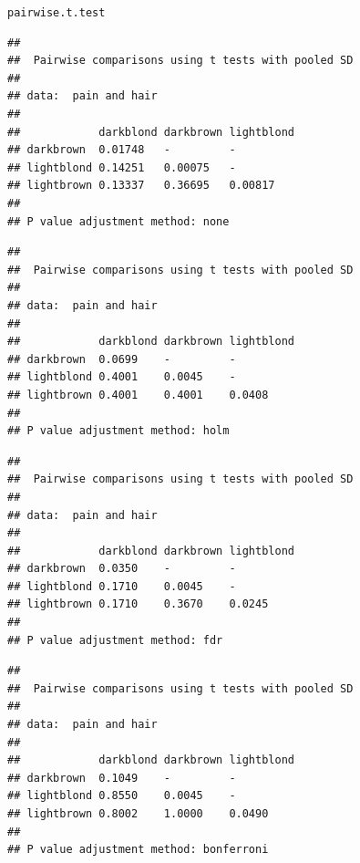 \begin{frame}[fragile]{\texttt{pairwise.t.test}}

  \begin{multicols}{2}
{\tiny
\begin{knitrout}
\color{fgcolor}\begin{kframe}
\begin{alltt}
\hlstd{=}\hlstd{)}
\end{alltt}
\begin{verbatim}
## 
## 	Pairwise comparisons using t tests with pooled SD 
## 
## data:  pain and hair 
## 
##            darkblond darkbrown lightblond
## darkbrown  0.01748   -         -         
## lightblond 0.14251   0.00075   -         
## lightbrown 0.13337   0.36695   0.00817   
## 
## P value adjustment method: none
\end{verbatim}
\begin{alltt}
\hlstd{=}\hlstd{)}
\end{alltt}
\begin{verbatim}
## 
## 	Pairwise comparisons using t tests with pooled SD 
## 
## data:  pain and hair 
## 
##            darkblond darkbrown lightblond
## darkbrown  0.0699    -         -         
## lightblond 0.4001    0.0045    -         
## lightbrown 0.4001    0.4001    0.0408    
## 
## P value adjustment method: holm
\end{verbatim}
\end{kframe}
\end{knitrout}

\begin{knitrout}
\color{fgcolor}\begin{kframe}
\begin{alltt}
\hlstd{=}\hlstd{)}
\end{alltt}
\begin{verbatim}
## 
## 	Pairwise comparisons using t tests with pooled SD 
## 
## data:  pain and hair 
## 
##            darkblond darkbrown lightblond
## darkbrown  0.0350    -         -         
## lightblond 0.1710    0.0045    -         
## lightbrown 0.1710    0.3670    0.0245    
## 
## P value adjustment method: fdr
\end{verbatim}
\begin{alltt}
\hlstd{=}\hlstd{)}
\end{alltt}
\begin{verbatim}
## 
## 	Pairwise comparisons using t tests with pooled SD 
## 
## data:  pain and hair 
## 
##            darkblond darkbrown lightblond
## darkbrown  0.1049    -         -         
## lightblond 0.8550    0.0045    -         
## lightbrown 0.8002    1.0000    0.0490    
## 
## P value adjustment method: bonferroni
\end{verbatim}
\end{kframe}
\end{knitrout}
}
    

\end{multicols}
\end{frame}
